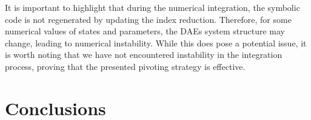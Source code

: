 It is important to highlight that during the numerical integration, the symbolic code is not regenerated by updating the index reduction. Therefore, for some numerical values of states and parameters, the \acp{DAE} system structure may change, leading to numerical instability. While this does pose a potential issue, it is worth noting that we have not encountered instability in the integration process, proving that the presented pivoting strategy is effective.




\section{Conclusions}
\label{chap3:sec:conclusions}


